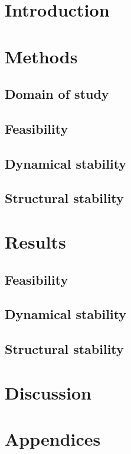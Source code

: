 \documentclass[12pt, titlepage, twoside, openright]{report}
\begin{document}
  
  \tableofcontents
  \chapter{Introduction}
  

  \chapter{Methods}\label{chap : methods}
  \section{Domain of study}\label{sec : domain of study}
  
  \FloatBarrier
  \newpage
  \section{Feasibility}\label{sec : methods feasibility}
  
  \FloatBarrier
  \newpage
  \section{Dynamical stability}\label{sec : methods dynamical stability}
  
  \FloatBarrier
  \newpage
  \section{Structural stability}
  
  \FloatBarrier

  \chapter{Results}\label{chapter : results}
  
  \section{Feasibility}
  
  \FloatBarrier
  \newpage
  \section{Dynamical stability}
  
  \FloatBarrier
  \clearpage
  \section{Structural stability}\label{sec : results structural stability}
  
  \FloatBarrier

  \chapter{Discussion}
  
  \FloatBarrier

  \chapter{Appendices}
  
  \printbibliography
\end{document}
